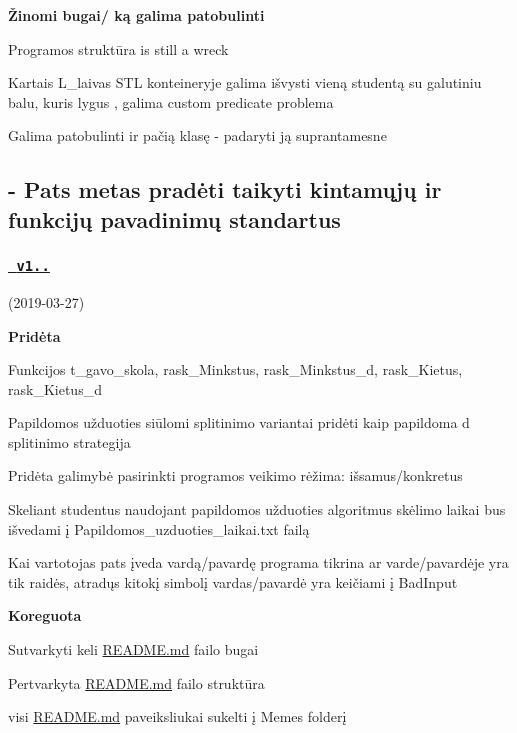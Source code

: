 {\bfseries{Žinomi bugai/ ką galima patobulinti}}
\begin{DoxyItemize}
\item Programos struktūra is still a wreck
\item Kartais {\ttfamily L\+\_\+laivas} S\+TL konteineryje galima išvysti vieną studentą su galutiniu balu, kuris lygus {}, galima custom predicate problema
\item Galima patobulinti ir pačią klasę -\/ padaryti ją suprantamesne \subsection*{-\/ Pats metas pradėti taikyti kintamųjų ir funkcijų pavadinimų standartus }
\end{DoxyItemize}

\subsubsection*{\href{https://github.com/gitguuddd/Obj_Duomenu_apdorojimas/releases/tag/v1.0.1}{\texttt{ v1..}}}

(2019-\/03-\/27)

{\bfseries{Pridėta}}
\begin{DoxyItemize}
\item Funkcijos {\ttfamily t\+\_\+gavo\+\_\+skola, rask\+\_\+\+Minkstus, rask\+\_\+\+Minkstus\+\_\+d, rask\+\_\+\+Kietus, rask\+\_\+\+Kietus\+\_\+d}
\item Papildomos užduoties siūlomi splitinimo variantai pridėti kaip papildoma {\ttfamily d} splitinimo strategija
\item Pridėta galimybė pasirinkti programos veikimo rėžima\+: išsamus/konkretus
\item Skeliant studentus naudojant papildomos užduoties algoritmus skėlimo laikai bus išvedami į {\ttfamily Papildomos\+\_\+uzduoties\+\_\+laikai.\+txt} failą
\item Kai vartotojas pats įveda vardą/pavardę programa tikrina ar varde/pavardėje yra tik raidės, atradųs kitokį simbolį vardas/pavardė yra keičiami į {\ttfamily Bad\+Input}
\end{DoxyItemize}

{\bfseries{Koreguota}}
\begin{DoxyItemize}
\item Sutvarkyti keli \mbox{\hyperlink{_r_e_a_d_m_e_8md}{R\+E\+A\+D\+M\+E.\+md}} failo bug\textquotesingle{}ai
\item Pertvarkyta \mbox{\hyperlink{_r_e_a_d_m_e_8md}{R\+E\+A\+D\+M\+E.\+md}} failo struktūra
\item visi \mbox{\hyperlink{_r_e_a_d_m_e_8md}{R\+E\+A\+D\+M\+E.\+md}} paveiksliukai sukelti į {\ttfamily Memes} folderį
\end{DoxyItemize}



